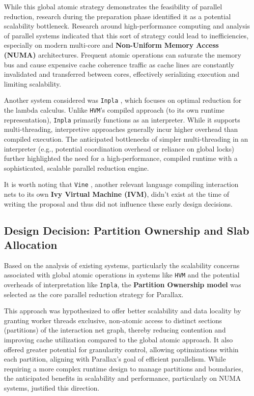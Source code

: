 While this global atomic strategy demonstrates the feasibility of parallel reduction, research during the preparation phase identified it as a potential scalability bottleneck. Research around high-performance computing and analysis of parallel systems indicated that this sort of strategy could lead to inefficiencies, especially on modern multi-core and \textbf{Non-Uniform Memory Access (NUMA)} architectures. Frequent atomic operations can saturate the memory bus and cause expensive cache coherence traffic as cache lines are constantly invalidated and transferred between cores, effectively serializing execution and limiting scalability.

Another system considered was \texttt{Inpla} \cite{inpla}, which focuses on optimal reduction for the lambda calculus. Unlike \texttt{HVM}'s compiled approach (to its own runtime representation), \texttt{Inpla} primarily functions as an interpreter. While it supports multi-threading, interpretive approaches generally incur higher overhead than compiled execution. The anticipated bottlenecks of simpler multi-threading in an interpreter (e.g., potential coordination overhead or reliance on global locks) further highlighted the need for a high-performance, compiled runtime with a sophisticated, scalable parallel reduction engine.

It is worth noting that \texttt{Vine} \cite{VineGithub}, another relevant language compiling interaction nets to its own \textbf{Ivy Virtual Machine (IVM)}, didn't exist at the time of writing the proposal and thus did not influence these early design decisions.

\subsection{Design Decision: Partition Ownership and Slab Allocation}
Based on the analysis of existing systems, particularly the scalability concerns associated with global atomic operations in systems like \texttt{HVM} and the potential overheads of interpretation like \texttt{Inpla}, the \textbf{Partition Ownership model} was selected as the core parallel reduction strategy for Parallax.

This approach was hypothesized to offer better scalability and data locality by granting worker threads exclusive, non-atomic access to distinct sections (partitions) of the interaction net graph, thereby reducing contention and improving cache utilization compared to the global atomic approach. It also offered greater potential for granularity control, allowing optimizations within each partition, aligning with Parallax's goal of efficient parallelism. While requiring a more complex runtime design to manage partitions and boundaries, the anticipated benefits in scalability and performance, particularly on NUMA systems, justified this direction.

